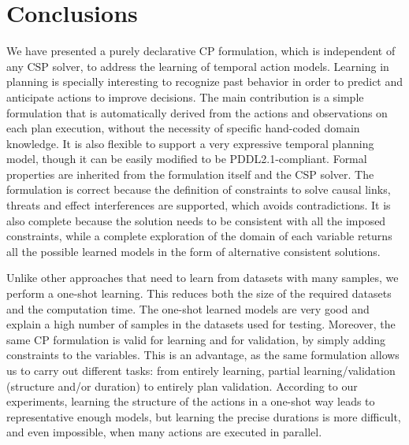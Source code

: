 \documentclass[runningheads]{llncs}
\begin{document}


\section{Conclusions}
\label{sec:conclusions}


We have presented a purely declarative CP formulation, which is independent of any CSP solver, to address the learning of temporal action models. Learning in planning is specially interesting to recognize past behavior in order to predict and anticipate actions to improve decisions.
The main contribution is a simple formulation that is automatically derived from the actions and observations on each plan execution, without the necessity of specific hand-coded domain knowledge. It is also flexible to support a very expressive temporal planning model, though it can be easily modified to be PDDL2.1-compliant.
Formal properties are inherited from the formulation itself and the CSP solver. The formulation is correct because the definition of constraints to solve causal links, threats and effect interferences are supported, which avoids contradictions. It is also complete because the solution needs to be consistent with all the imposed constraints, while a complete exploration of the domain of each variable returns all the possible learned models in the form of alternative consistent solutions.


Unlike other approaches that need to learn from datasets with many samples, we perform a one-shot learning. This reduces both the size of the required datasets and the computation time. The one-shot learned models are very good and explain a high number of samples in the datasets used for testing. Moreover, the same CP formulation is valid for learning and for validation, by simply adding constraints to the variables. This is an advantage, as the same formulation allows us to carry out different tasks: from entirely learning, partial learning/validation (structure and/or duration) to entirely plan validation.
According to our experiments, learning the structure of the actions in a one-shot way leads to representative enough models, but learning the precise durations is more difficult, and even impossible, when many actions are executed in parallel.
\end{document}
